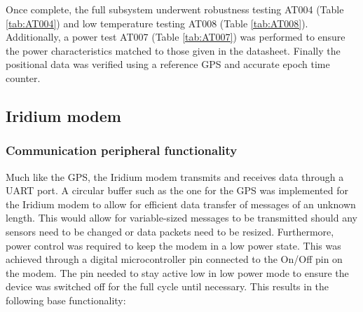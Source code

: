 Once complete, the full subsystem underwent robustness testing AT004 (Table \ref{tab:AT004}) and low temperature testing AT008 (Table \ref{tab:AT008}). Additionally, a power test  AT007 (Table \ref{tab:AT007}) was performed to ensure the power characteristics matched to those given in the datasheet. Finally the positional data was verified using a reference GPS and accurate epoch time counter.

\subsection{Iridium modem}

\subsubsection{Communication peripheral functionality}

Much like the GPS, the Iridium modem transmits and receives data through a UART port. A circular buffer such as the one for the GPS was implemented for the Iridium modem to allow for efficient data transfer of messages of an unknown length. This would allow for variable-sized messages to be transmitted should any sensors need to be changed or data packets need to be resized. Furthermore, power control was required to keep the modem in a low power state. This was achieved through a digital microcontroller pin connected to the On/Off pin on the modem. The pin needed to stay active low in low power mode to ensure the device was switched off for the full cycle until necessary. This results in the following base functionality:


